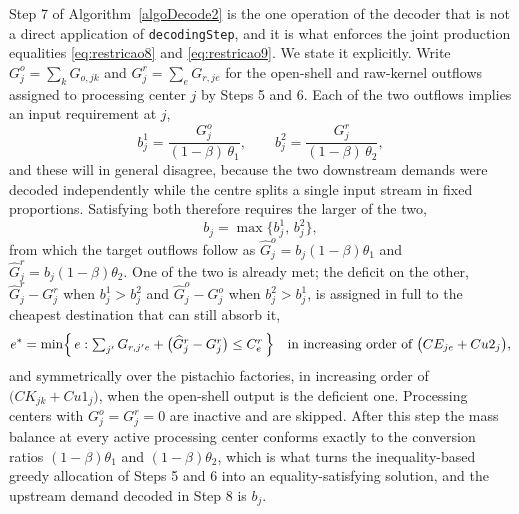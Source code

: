 \documentclass[preprint,12pt,authoryear]{elsarticle}
\begin{document}
Step 7 of Algorithm~\ref{algoDecode2} is the one operation of the decoder that is not a direct application of \texttt{decodingStep}, and it is what enforces the joint production
equalities \eqref{eq:restricao8} and \eqref{eq:restricao9}. We state it explicitly. Write $G^{o}_{j} = \sum_{k} G_{o,jk}$ and $G^{r}_{j} = \sum_{e} G_{r,je}$ for the open-shell and
raw-kernel outflows assigned to processing center $j$ by Steps 5 and 6. Each of the two outflows implies an input requirement at $j$,
%
\begin{equation}
\label{eq:implied_input}
b^{1}_{j} = \frac{G^{o}_{j}}{(1-\beta)\,\theta_1}, \qquad b^{2}_{j} = \frac{G^{r}_{j}}{(1-\beta)\,\theta_2},
\end{equation}
%
and these will in general disagree, because the two downstream demands were decoded independently while the centre splits a single input stream in fixed proportions. Satisfying both
therefore requires the larger of the two,
%
\begin{equation}
\label{eq:binding_input}
b_{j} = \max\bigl\{ b^{1}_{j},\, b^{2}_{j} \bigr\},
\end{equation}
%
from which the target outflows follow as $\widehat{G}^{o}_{j} = b_{j}(1-\beta)\theta_1$ and $\widehat{G}^{r}_{j} = b_{j}(1-\beta)\theta_2$. One of the two is already met; the deficit on
the other, $\widehat{G}^{r}_{j} - G^{r}_{j}$ when $b^{1}_{j} > b^{2}_{j}$ and $\widehat{G}^{o}_{j} - G^{o}_{j}$ when $b^{2}_{j} > b^{1}_{j}$, is assigned in full to the cheapest
destination that can still absorb it,
%
\begin{equation}
\label{eq:surplus_routing}
e^{*} = \min \Bigl\{\, e : \textstyle\sum_{j'} G_{r,j'e} + \bigl(\widehat{G}^{r}_{j} - G^{r}_{j}\bigr) \le C^{r}_{e} \,\Bigr\}
\quad \text{in increasing order of } \bigl( CE_{je} + Cu2_{j} \bigr),
\end{equation}
%
and symmetrically over the pistachio factories, in increasing order of $\bigl( CK_{jk} + Cu1_{j} \bigr)$, when the open-shell output is the deficient one. Processing centers with
$G^{o}_{j} = G^{r}_{j} = 0$ are inactive and are skipped. After this step the mass balance at every active processing center conforms exactly to the conversion ratios
$(1-\beta)\theta_1$ and $(1-\beta)\theta_2$, which is what turns the inequality-based greedy allocation of Steps 5 and 6 into an equality-satisfying solution, and the upstream demand
decoded in Step 8 is $b_{j}$.
\end{document}
